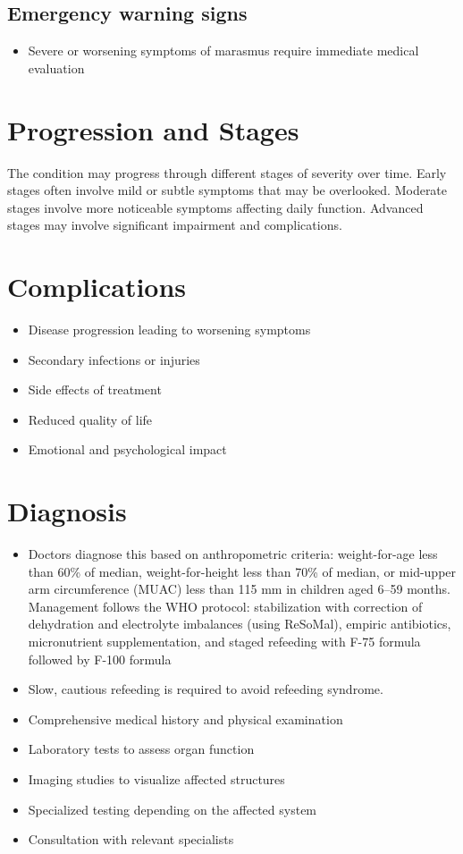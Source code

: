 \subsection{Emergency warning signs}
\begin{itemize}[noitemsep]
  \item Severe or worsening symptoms of marasmus require immediate medical evaluation
\end{itemize}
\section{Progression and Stages}
The condition may progress through different stages of severity over time. Early stages often involve mild or subtle symptoms that may be overlooked. Moderate stages involve more noticeable symptoms affecting daily function. Advanced stages may involve significant impairment and complications.
\section{Complications}
\begin{itemize}[noitemsep]
  \item Disease progression leading to worsening symptoms
  \item Secondary infections or injuries
  \item Side effects of treatment
  \item Reduced quality of life
  \item Emotional and psychological impact
\end{itemize}
\section{Diagnosis}
\begin{itemize}[noitemsep]
  \item Doctors diagnose this based on anthropometric criteria: weight-for-age less than 60\% of median, weight-for-height less than 70\% of median, or mid-upper arm circumference (MUAC) less than 115 mm in children aged 6--59 months. Management follows the WHO protocol: stabilization with correction of dehydration and electrolyte imbalances (using ReSoMal), empiric antibiotics, micronutrient supplementation, and staged refeeding with F-75 formula followed by F-100 formula
  \item Slow, cautious refeeding is required to avoid refeeding syndrome.
  \item Comprehensive medical history and physical examination
  \item Laboratory tests to assess organ function
  \item Imaging studies to visualize affected structures
  \item Specialized testing depending on the affected system
  \item Consultation with relevant specialists
\end{itemize}
